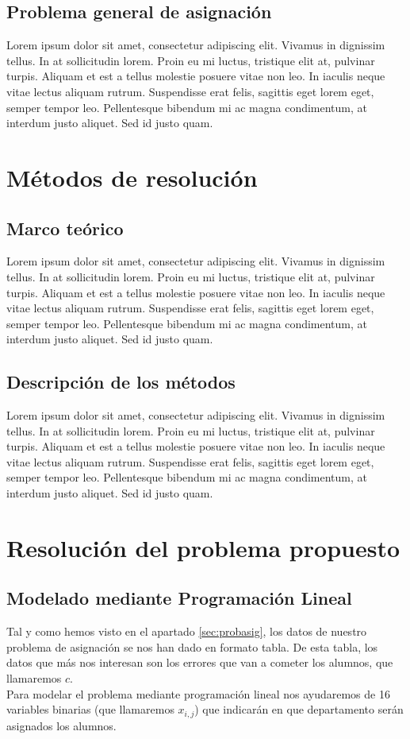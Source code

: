 \documentclass[11pt]{article}
\begin{document}
\subsection{Problema general de asignación}
Lorem ipsum dolor sit amet, consectetur adipiscing elit. Vivamus in dignissim tellus. In at sollicitudin lorem. Proin eu mi luctus, tristique elit at, pulvinar turpis. Aliquam et est a tellus molestie posuere vitae non leo. In iaculis neque vitae lectus aliquam rutrum. Suspendisse erat felis, sagittis eget lorem eget, semper tempor leo. Pellentesque bibendum mi ac magna condimentum, at interdum justo aliquet. Sed id justo quam. 


\section{Métodos de resolución}
\subsection{Marco teórico}
Lorem ipsum dolor sit amet, consectetur adipiscing elit. Vivamus in dignissim tellus. In at sollicitudin lorem. Proin eu mi luctus, tristique elit at, pulvinar turpis. Aliquam et est a tellus molestie posuere vitae non leo. In iaculis neque vitae lectus aliquam rutrum. Suspendisse erat felis, sagittis eget lorem eget, semper tempor leo. Pellentesque bibendum mi ac magna condimentum, at interdum justo aliquet. Sed id justo quam. 

\subsection{Descripción de los métodos}
Lorem ipsum dolor sit amet, consectetur adipiscing elit. Vivamus in dignissim tellus. In at sollicitudin lorem. Proin eu mi luctus, tristique elit at, pulvinar turpis. Aliquam et est a tellus molestie posuere vitae non leo. In iaculis neque vitae lectus aliquam rutrum. Suspendisse erat felis, sagittis eget lorem eget, semper tempor leo. Pellentesque bibendum mi ac magna condimentum, at interdum justo aliquet. Sed id justo quam. 

\section{Resolución del problema propuesto}
\subsection{Modelado mediante Programación Lineal}
Tal y como hemos visto en el apartado \ref{sec:probasig}, los datos de nuestro problema de asignación se nos han dado en formato tabla. De esta tabla, los datos que más nos interesan son los errores que van a cometer los alumnos, que llamaremos $c$.\\
Para modelar el problema mediante programación lineal nos ayudaremos de 16 variables binarias (que llamaremos $x_{i,j}$) que indicarán en que departamento serán asignados los alumnos.
\end{document}
